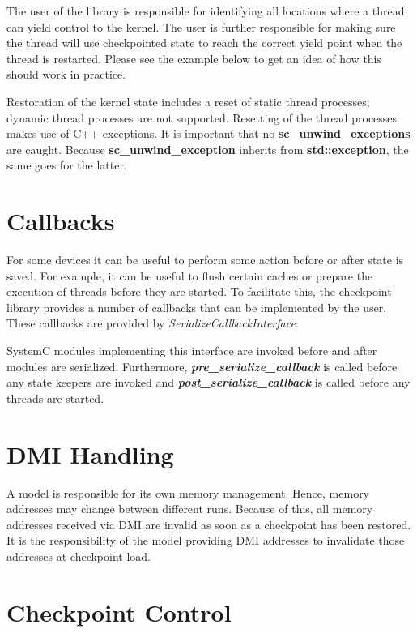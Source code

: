 \documentclass[oneside]{memoir}
\begin{document}
The user of the library is responsible for identifying all locations where a thread can yield control to the kernel.
The user is further responsible for making sure the thread will use checkpointed state to reach the correct yield point when the thread is restarted.
Please see the example below to get an idea of how this should work in practice.



Restoration of the kernel state includes a reset of static thread processes; dynamic thread processes are not supported.
Resetting of the thread processes makes use of C++ exceptions.
It is important that no \textbf{sc\_unwind\_exceptions} are caught.
Because \textbf{sc\_unwind\_exception} inherits from \textbf{std::exception}, the same goes for the latter.

\chapter{Callbacks}
\label{callbacks}

For some devices it can be useful to perform some action before or after state is saved.
For example, it can be useful to flush certain caches or prepare the execution of threads before they are started.
To facilitate this, the checkpoint library provides a number of callbacks that can be implemented by the user.
These callbacks are provided by \textit{SerializeCallbackInterface}:



SystemC modules implementing this interface are invoked before and
after modules are serialized.
Furthermore, \textit{\textbf{pre\_serialize\_callback}} is called before any state keepers are invoked and \textit{\textbf{post\_serialize\_callback}} is called before any threads are started.

\chapter{DMI Handling}
\label{dmi-handling}

A model is responsible for its own memory management.
Hence, memory addresses may change between different runs.
Because of this, all memory addresses received via DMI are invalid as soon as a checkpoint has been restored.
It is the responsibility of the model providing DMI addresses to invalidate those addresses at checkpoint load.

\chapter{Checkpoint Control}
\label{control}
\end{document}
